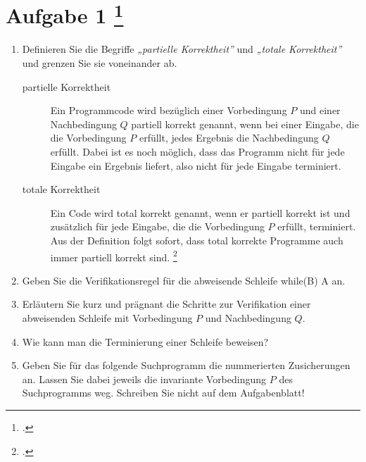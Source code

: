 \documentclass{lehramt-informatik-aufgabe}
\begin{document}
\section{Aufgabe 1
\footcite{66116:2020:09}}

\begin{enumerate}


\item Definieren Sie die Begriffe \emph{„partielle Korrektheit”} und
\emph{„totale Korrektheit”} und grenzen Sie sie voneinander ab.

\begin{liAntwort}
\begin{description}
\item[partielle Korrektheit]

Ein Programmcode wird bezüglich einer Vorbedingung $P$ und einer
Nachbedingung $Q$ partiell korrekt genannt, wenn bei einer Eingabe, die
die Vorbedingung $P$ erfüllt, jedes Ergebnis die Nachbedingung $Q$
erfüllt. Dabei ist es noch möglich, dass das Programm nicht für jede
Eingabe ein Ergebnis liefert, also nicht für jede Eingabe terminiert.

\item[totale Korrektheit]

Ein Code wird total korrekt genannt, wenn er partiell korrekt ist und
zusätzlich für jede Eingabe, die die Vorbedingung $P$ erfüllt,
terminiert. Aus der Definition folgt sofort, dass total korrekte
Programme auch immer partiell korrekt sind.
\footcite{wiki:korrektheit}
\end{description}
\end{liAntwort}


\item Geben Sie die Verifikationsregel für die abweisende Schleife
while(B) A an.


\item Erläutern Sie kurz und prägnant die Schritte zur Verifikation
einer abweisenden Schleife mit Vorbedingung $P$ und Nachbedingung $Q$.


\item Wie kann man die Terminierung einer Schleife beweisen?


\item Geben Sie für das folgende Suchprogramm die nummerierten
Zusicherungen an. Lassen Sie dabei jeweils die invariante Vorbedingung
$P$ des Suchprogramms weg. Schreiben Sie nicht auf dem Aufgabenblatt!


\end{enumerate}
\end{document}
